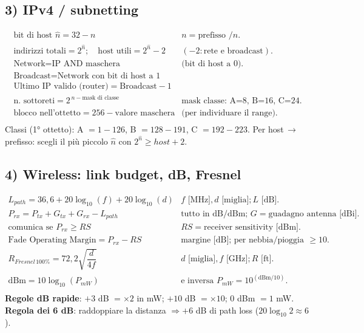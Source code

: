 \documentclass[11pt,a4paper]{report}
\begin{document}
\subsection*{3) IPv4 / subnetting}
\[
\begin{array}{ll}
\text{bit di host } \hat n = 32-n & n=\text{prefisso } /n.\\[4pt]
\text{indirizzi totali}=2^{\hat n};\quad \text{host utili}=2^{\hat n}-2 & (-2: \text{rete e broadcast}).\\[4pt]
\text{Network}=\text{IP AND maschera} & \text{(bit di host a 0).}\\[4pt]
\text{Broadcast}=\text{Network con bit di host a 1} & \\[4pt]
\text{Ultimo IP valido (router)}=\text{Broadcast}-1 & \\[4pt]
\text{n.\ sottoreti}=2^{\,n-\text{mask di classe}} & \text{mask classe: A=8, B=16, C=24.}\\[4pt]
\text{blocco nell'ottetto}=256-\text{valore maschera} & \text{(per individuare il range).}\\[2pt]
\end{array}
\]
Classi (1° ottetto): A $=1\!-\!126$, B $=128\!-\!191$, C $=192\!-\!223$. Per
host\,$\to$\,prefisso: scegli il più piccolo $\hat n$ con $2^{\hat n}\ge host+2$.

\subsection*{4) Wireless: link budget, dB, Fresnel}
\[
\begin{array}{ll}
L_{path}=36{,}6+20\log_{10}(f)+20\log_{10}(d) & f \text{ [MHz]}, d \text{ [miglia]}; L \text{ [dB]}.\\[6pt]
P_{rx}=P_{tx}+G_{tx}+G_{rx}-L_{path} & \text{tutto in dB/dBm; } G=\text{guadagno antenna [dBi]}.\\[6pt]
\text{comunica se } P_{rx}\ge RS & RS=\text{receiver sensitivity [dBm]}.\\[6pt]
\text{Fade Operating Margin}=P_{rx}-RS & \text{margine [dB]; per nebbia/pioggia chiedi }\ge 10.\\[6pt]
R_{Fresnel\,100\%}=72{,}2\sqrt{\dfrac{d}{4f}} & d \text{ [miglia]}, f \text{ [GHz]}; R \text{ [ft]}.\\[6pt]
\text{dBm}=10\log_{10}(P_{mW}) & \text{e inversa } P_{mW}=10^{(\text{dBm}/10)}.\\[4pt]
\end{array}
\]
\textbf{Regole dB rapide}: $+3$ dB $=\times2$ in mW; $+10$ dB $=\times10$;
$0$ dBm $=1$ mW. \textbf{Regola dei 6 dB}: raddoppiare la distanza
$\Rightarrow +6$ dB di path loss ($20\log_{10}2\approx6$).
\end{document}

